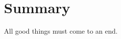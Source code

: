 \cleardoubleevenemptypage
\chapter{Summary}
\label{ch:summary}

\pgfmathsetmacro\chapclr{\colourarray[7]}
\hypersetup{
citecolor  = \chapclr,
linkcolor  = \chapclr,
urlcolor   = \chapclr,
}

\epigraph{
  All good things must come to an end.
}{
  
}
\lipsum[1-6]